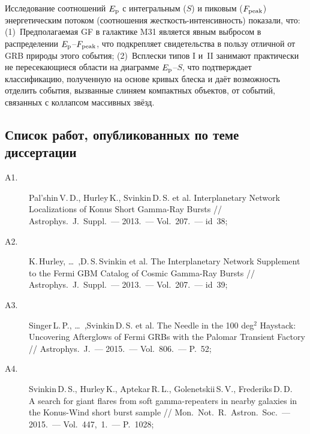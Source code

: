 \begin{enumerate}
    Исследование соотношений $E_{\mathrm{p}}$ с интегральным ($S$) и пиковым ($F_{\mathrm{peak}}$) 
    энергетическим потоком (соотношения жесткость-интенсивность) показали, что:
    (1)~Предполагаемая GF в галактике M31 является явным выбросом в распределении 
    $E_{\mathrm{p}}$--$F_{\mathrm{peak}}$,  что подкрепляет свидетельства в пользу отличной 
    от GRB природы этого события;
    (2)~Всплески типов I и~II занимают практически не пересекающиеся области 
    на диаграмме $E_{\mathrm{p}}$--$S$, что подтверждает классификацию, полученную на 
    основе кривых блеска и даёт возможность отделить события, 
    вызванные слиняем компактных объектов, от событий, связанных с коллапсом массивных звёзд.
  
\end{enumerate}


\subsection*{\Large Список работ, опубликованных по теме диссертации}
\begin{description}
\item [A1.] Pal'shin\,V.\,D., Hurley\,K., Svinkin\,D.\,S. et al. Interplanetary Network Localizations of
Konus Short Gamma-Ray Bursts // Astrophys.~J.~Suppl.~--- 2013.~--- Vol.~207.~--- id~38;
\item [A2.] K.\,Hurley, \dots\ ,D.\,S.\,Svinkin et al. The Interplanetary Network Supplement to 
the Fermi GBM Catalog of Cosmic Gamma-Ray Bursts // Astrophys.~J.~Suppl.~--- 2013.~--- Vol.~207.~--- id~39;
\item [A3.] Singer\,L.\,P., \dots\ ,Svinkin\,D.\,S. et al. The Needle in the 100 deg$^2$ Haystack: 
Uncovering Afterglows of Fermi GRBs with the Palomar Transient Factory // 
Astrophys.~J.~--- 2015.~--- Vol.~806.~--- P.~52;
\item [A4.] Svinkin\,D.\,S., Hurley\,K., Aptekar\,R.\,L., Golenetskii\,S.\,V., Frederiks\,D.\,D. \\ 
A search for giant flares from soft gamma-repeaters in nearby galaxies in the 
Konus-Wind short burst sample // Mon.~Not.~R.~Astron.~Soc.~--- 2015.~--- Vol.~447,~1.~--- P.~1028;

\end{description}

\renewcommand{\refname}{Литература, цитируемая в автореферате}


